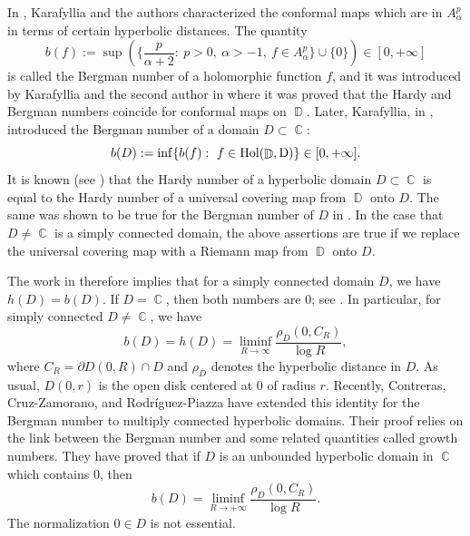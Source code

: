 \documentclass[11pt, letterpaper,leqno]{amsart}
\numberwithin{equation}{section}
\theoremstyle{definition}
\DeclareMathOperator{\D}{\mathbb{D}}
\DeclareMathOperator{\C}{\mathbb{C}}
\begin{document}
In \cite{BKK}, Karafyllia and the authors  characterized the conformal maps which are in $A_\alpha^p$ in terms of certain hyperbolic distances.
The quantity
\[
b(f):=\sup\left(\bigg\{\frac{p}{\alpha+2}:\ p>0,\ \alpha>-1,\ f\in A_\alpha^p\bigg\}\cup\{0\}\right)\in [0,+\infty]
\]
is called the Bergman number of a holomorphic function $f$, and it was introduced by Karafyllia and  the second author   in \cite{KrfKrm} where it was proved that the Hardy and Bergman numbers coincide for conformal maps on $\D$. Later, Karafyllia, in \cite{Krf3}, introduced the Bergman number of a domain $D\subset\C$:
\[
b(D):= \inf\{b(f):\ f\in \rm{Hol}(\D, D)\} \in [0,+\infty].
\]
It is known (see \cite[Lemma 2.1]{KimSug}) that the Hardy number of a hyperbolic domain $D\subset\C$ is equal to the Hardy number of a universal covering map from $\D$ onto $D$. The same was shown to be true for the Bergman number of $D$ in \cite[Lemma 2.13]{BZ}. In the case that $D\neq\C$ is a simply connected domain, the above assertions are true if we replace the universal covering map with a Riemann map from $\D$ onto $D$. 

The work in \cite[Theorem 1.3]{KrfKrm} therefore implies that for a simply connected domain $D$, we have $h(D)=b(D)$. If $D=\C$, then both numbers are $0$; see \cite[Lemma 2.2]{Krf3}. In particular, for simply connected $D\neq\C$, we have
\[
b(D)=h(D)=\liminf_{R\to \infty} \frac{\rho_D(0,C_R)}{\log R},
\]
where $C_R=\partial D(0,R)\cap D$ and $\rho_D$ denotes the hyperbolic distance in $D$. As usual, $D(0,r)$ is the open disk centered at $0$ of radius $r$. Recently, Contreras, Cruz-Zamorano, and Rodr\'{i}guez-Piazza \cite[Theorem 1.2]{CZRP} have extended this identity for the Bergman number to multiply connected hyperbolic domains. Their proof relies on the link between the Bergman number and some related quantities called growth numbers. They have proved that if $D$ is an unbounded hyperbolic domain in $\C$ which contains $0$, then
\begin{equation}\label{bergmanid}
	b(D)=\liminf_{R\to +\infty}\frac{\rho_D(0,C_R)}{\log R}.
\end{equation}
The normalization $0\in D$ is not essential.
\end{document}
